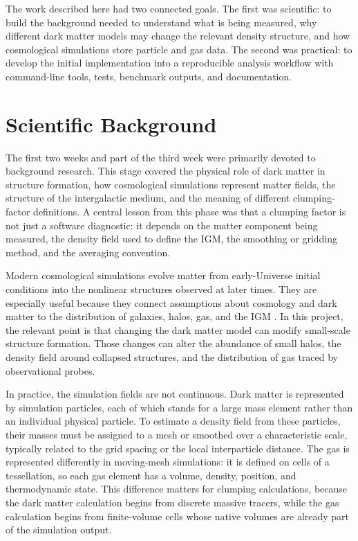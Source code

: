 \documentclass[
    aps,
    prd,
    preprint,
    onecolumn,
    nofootinbib,
    groupedaddress
]{revtex4-2}
\begin{document}
The work described here had two connected goals. The first was scientific: to build the background needed to understand what is being measured, why different dark matter models may change the relevant density structure, and how cosmological simulations store particle and gas data. The second was practical: to develop the initial implementation into a reproducible analysis workflow with command-line tools, tests, benchmark outputs, and documentation.

\section{Scientific Background}

The first two weeks and part of the third week were primarily devoted to background research. This stage covered the physical role of dark matter in structure formation, how cosmological simulations represent matter fields, the structure of the intergalactic medium, and the meaning of different clumping-factor definitions. A central lesson from this phase was that a clumping factor is not just a software diagnostic: it depends on the matter component being measured, the density field used to define the IGM, the smoothing or gridding method, and the averaging convention.

Modern cosmological simulations evolve matter from early-Universe initial conditions into the nonlinear structures observed at later times. They are especially useful because they connect assumptions about cosmology and dark matter to the distribution of galaxies, halos, gas, and the IGM \cite{vogelsberger2019}. In this project, the relevant point is that changing the dark matter model can modify small-scale structure formation. Those changes can alter the abundance of small halos, the density field around collapsed structures, and the distribution of gas traced by observational probes.

In practice, the simulation fields are not continuous. Dark matter is represented by simulation particles, each of which stands for a large mass element rather than an individual physical particle. To estimate a density field from these particles, their masses must be assigned to a mesh or smoothed over a characteristic scale, typically related to the grid spacing or the local interparticle distance. The gas is represented differently in moving-mesh simulations: it is defined on cells of a tessellation, so each gas element has a volume, density, position, and thermodynamic state. This difference matters for clumping calculations, because the dark matter calculation begins from discrete massive tracers, while the gas calculation begins from finite-volume cells whose native volumes are already part of the simulation output.
\end{document}
